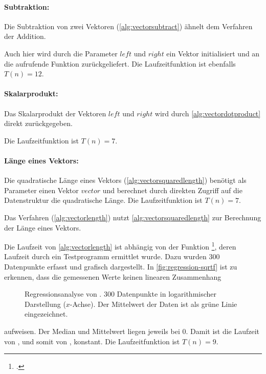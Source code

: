 
\paragraph{Subtraktion:} %
\label{par:subtraktion}

Die Subtraktion von zwei Vektoren (\autoref{alg:vectorsubtract}) ähnelt dem Verfahren der Addition.

Auch hier wird durch die Parameter $\mathit{left}$ und $\mathit{right}$ ein Vektor initialisiert und an die
 aufrufende Funktion zurückgeliefert. Die Laufzeitfunktion ist ebenfalls $T(n) = 12$.


\paragraph{Skalarprodukt:} %
\label{par:skalarprodukt}

Das Skalarprodukt der Vektoren $\mathit{left}$ und $\mathit{right}$ wird durch \autoref{alg:vectordotproduct} direkt
 zurückgegeben.

Die Laufzeitfunktion ist $T(n) = 7$.


\paragraph{Länge eines Vektors:} %
\label{par:länge_eines_vektors}

Die quadratische Länge eines Vektors (\autoref{alg:vectorsquaredlength}) benötigt als Parameter einen Vektor
 $\mathit{vector}$ und berechnet durch direkten Zugriff auf die Datenstruktur die quadratische Länge. Die
 Laufzeitfunktion ist $T(n) = 7$.

Das Verfahren  (\autoref{alg:vectorlength}) nutzt \autoref{alg:vectorsquaredlength} zur Berechnung der
 Länge eines Vektors.

Die Laufzeit von \autoref{alg:vectorlength} ist abhängig von der Funktion \footcite[Vgl.][]{sqrtf},
 deren Laufzeit durch ein Testprogramm ermittlet wurde. Dazu wurden $300$ Datenpunkte erfasst und grafisch dargestellt.
 In \autoref{fig:regression-sqrtf} ist zu erkennen, dass die gemessenen Werte keinen linearen Zusammenhang
\begin{figure}[!ht]
	\centering
	
	\caption{Regressionsanalyse von . $300$ Datenpunkte in logarithmischer Darstellung ($x$-Achse). Der
	 Mittelwert der Daten ist als grüne Linie eingezeichnet.}
	\label{fig:regression-sqrtf}
\end{figure}
 aufweisen. Der Median und Mittelwert liegen jeweils bei $0$. Damit ist die Laufzeit von , und somit von
 , konstant. Die Laufzeitfunktion ist $T(n) = 9$.

